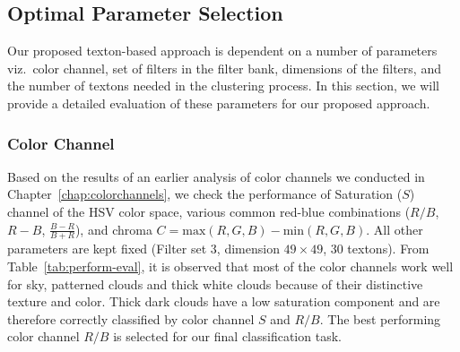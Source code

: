 \subsection{Optimal Parameter Selection}
\label{sec:chap6-optimalparams}
Our proposed texton-based approach is dependent on a number of parameters viz.\ color channel, set of filters in the filter bank, dimensions of the filters, and the number of textons needed in the clustering process. In this section, we will provide a detailed evaluation of these parameters for our proposed approach.

\subsubsection{Color Channel}
Based on the results of an earlier analysis of color channels we conducted in Chapter~\ref{chap:colorchannels}, we check the performance of Saturation ($S$) channel of the HSV color space, various common red-blue combinations ($R/B$, $R-B$, $\frac{B-R}{B+R}$), and chroma $C=\mbox{max}(R,G,B)-\mbox{min}(R,G,B)$. All other parameters are kept fixed (Filter set $3$, dimension $49 \times 49$, $30$ textons). From Table~\ref{tab:perform-eval}, it is observed that most of the color channels work well for sky, patterned clouds and thick white clouds because of their distinctive texture and color. Thick dark clouds have a low saturation component and are therefore correctly classified by color channel $S$ and $R/B$. The best performing color channel $R/B$ is selected for our final classification task. 

